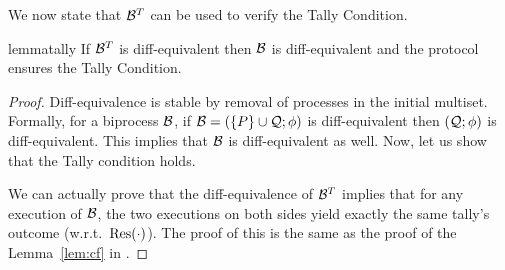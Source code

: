 We now state that $\mathcal{B}^T$ can be used to verify the Tally
Condition.
\begin{restatable}{lemma}{tally}
\label{lem:direct}
  If $\mathcal{B}^T$ is diff-equivalent
  then $\mathcal{B}$ is diff-equivalent and
  the protocol ensures the Tally Condition.
\end{restatable}
\begin{proof}

  Diff-equivalence is stable by removal of processes in the initial multiset.
  Formally, for a biprocess $\mathcal{B}$,
  if $\mathcal{B}=(\{P\}\cup\mathcal{Q};\phi)$ is diff-equivalent then $(\mathcal{Q};\phi)$ is diff-equivalent.
  This implies that $\mathcal{B}$ is diff-equivalent as well.
  Now, let us show that the Tally condition holds.

  We can actually prove that the diff-equivalence of $\mathcal{B}^T$ implies that
  for any execution of $\mathcal{B}$, the two executions on both sides yield exactly the same
  tally's outcome (w.r.t.~$\mathrm{Res}(\cdot)$). The proof of this is the same as the proof of
  the Lemma~\ref{lem:cf}  in .
  



\end{proof}
